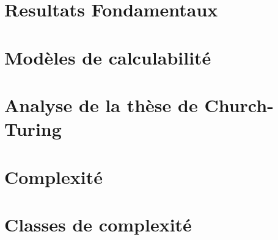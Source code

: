 \section{Resultats Fondamentaux}




\section{Modèles de calculabilité}




\section{Analyse de la thèse de Church-Turing}




\section{Complexité}




\section{Classes de complexité}

